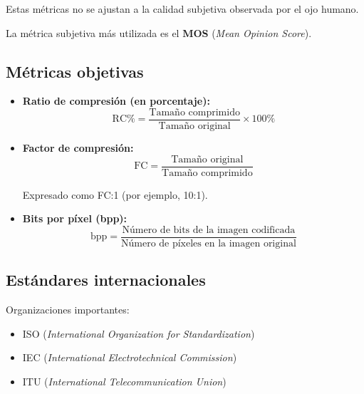 \documentclass[11pt,a4paper]{article}
\begin{document}
Estas métricas no se ajustan a la calidad subjetiva observada por el ojo humano.

La métrica subjetiva más utilizada es el \textbf{MOS} (\textit{Mean Opinion Score}).

\subsection{Métricas objetivas}

\begin{itemize}
    \item \textbf{Ratio de compresión (en porcentaje):}
    \[
        \text{RC\%} = \frac{\text{Tamaño comprimido}}{\text{Tamaño original}} \times 100 \%
    \]

    \item \textbf{Factor de compresión:}
    \[
        \text{FC} = \frac{\text{Tamaño original}}{\text{Tamaño comprimido}}
    \]

	Expresado como FC:1 (por ejemplo, 10:1).

    \item \textbf{Bits por píxel (bpp):}
    \[
        \text{bpp} = \frac{\text{Número de bits de la imagen codificada}}{\text{Número de píxeles en la imagen original}}
    \]
\end{itemize}

\subsection{Estándares internacionales}

Organizaciones importantes:
\begin{itemize}
    \item ISO (\textit{International Organization for Standardization})
    \item IEC (\textit{International Electrotechnical Commission})
    \item ITU (\textit{International Telecommunication Union})
\end{itemize}
\end{document}
